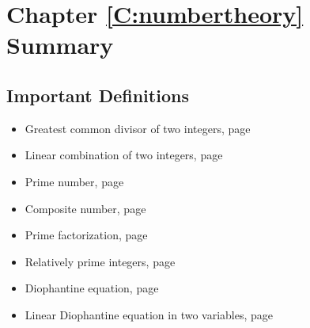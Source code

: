 \section{Chapter \ref{C:numbertheory} Summary} \label{Su:numbertheory}


\subsection*{Important Definitions}
\begin{itemize}
\item Greatest common divisor of two integers, page~\pageref*{gcd}
\item Linear combination of two integers, page~\pageref*{linearcombination}
\item Prime number, page~\pageref*{def:prime}
\item Composite number, page~\pageref*{def:prime}
\item Prime factorization, page~\pageref*{def:primefactorization}
\item Relatively prime integers, page~\pageref*{relativelyprime}
\item Diophantine equation, page~\pageref*{diophantineequation}
\item Linear Diophantine equation in two variables, page~\pageref*{lineardiophantine}
\end{itemize}



